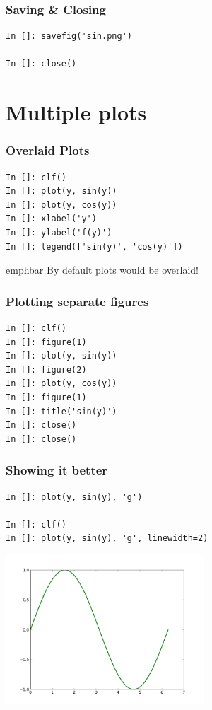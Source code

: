 \documentclass[14pt,compress]{beamer}
\newcommand{\emphbar}[1]
{\begin{beamercolorbox}[rounded=true]{emphbar} 
      {#1}
 \end{beamercolorbox}
}
\newcounter{time}
\newcommand{\inctime}[1]{\addtocounter{time}{#1}{\tiny \thetime\ m}}
\begin{document}
\begin{frame}[fragile]
\frametitle{Saving \& Closing}
\begin{lstlisting}
In []: savefig('sin.png')

In []: close()
\end{lstlisting}
\end{frame}

\section{Multiple plots}
\begin{frame}[fragile]
\frametitle{Overlaid Plots}
\begin{lstlisting}
In []: clf()
In []: plot(y, sin(y))
In []: plot(y, cos(y))
In []: xlabel('y')
In []: ylabel('f(y)')
In []: legend(['sin(y)', 'cos(y)']) 
\end{lstlisting}
\emphbar{By default plots would be overlaid!}
\end{frame}

\begin{frame}[fragile]
\frametitle{Plotting separate figures}
\begin{lstlisting}
In []: clf()
In []: figure(1)
In []: plot(y, sin(y))
In []: figure(2)
In []: plot(y, cos(y))
In []: figure(1)
In []: title('sin(y)')
In []: close()
In []: close()
\end{lstlisting}
\end{frame}

\begin{frame}[fragile]
\frametitle{Showing it better}
\vspace{-0.15in}
\begin{lstlisting}
In []: plot(y, sin(y), 'g')

In []: clf()
In []: plot(y, sin(y), 'g', linewidth=2)
\end{lstlisting}
\vspace*{-0.2in}
\begin{center}
  \includegraphics[height=2.2in, interpolate=true]{data/green}  
\end{center}
\end{frame}
\end{document}
